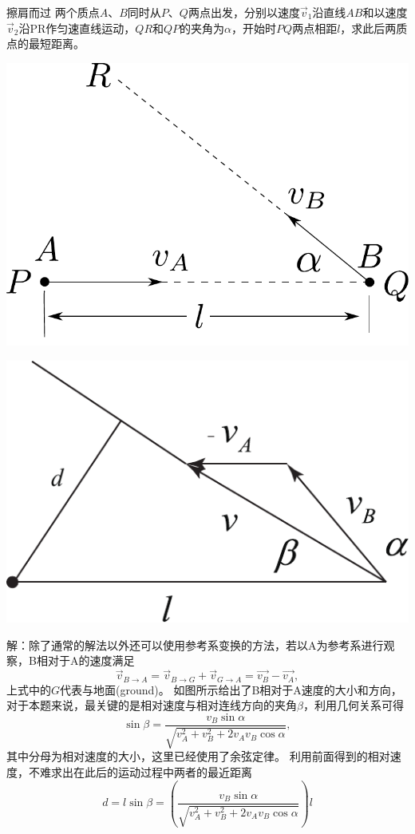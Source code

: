 \begin{app}{擦肩而过}{}
	两个质点$A$、$B$同时从$P$、$Q$两点出发，分别以速度$\vec{v}_{1}$沿直线$AB$和以速度$\vec{v}_2$沿PR作匀速直线运动，$QR$和$QP$的夹角为$\alpha$，开始时$PQ$两点相距$l$，求此后两质点的最短距离。
	\begin{center}
		\includegraphics[width=0.3\linewidth]{image/motion-problem-29}
	\end{center}
	\tcblower
	\begin{center}
		\includegraphics[width=0.3\linewidth]{image/motion-problem-1}
	\end{center}
	
	解：除了通常的解法以外还可以使用参考系变换的方法，若以A为参考系进行观察，B相对于A的速度满足
	\[
	\vec{v}_{B\rightarrow A} = 	\vec{v}_{B\rightarrow G}+	\vec{v}_{G\rightarrow A} = \vec{v_B}-\vec{v_A},
	\]
	上式中的$ G $代表与地面(ground)。
	如图所示给出了B相对于A速度的大小和方向，对于本题来说，最关键的是相对速度与相对连线方向的夹角$ \beta $，利用几何关系可得
	\[
	\sin\beta = \frac{v_B\sin\alpha}{\sqrt{v_A^2+v_B^2+2v_Av_B\cos\alpha}},
	\]
	其中分母为相对速度的大小，这里已经使用了余弦定律。
	利用前面得到的相对速度，不难求出在此后的运动过程中两者的最近距离
	\[
	d = l\sin\beta =\left( \frac{v_B\sin\alpha}{\sqrt{v_A^2+v_B^2+2v_Av_B\cos\alpha}}\right)l
	\]
	
\end{app}




